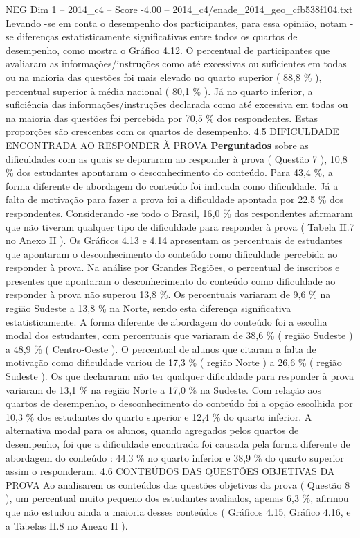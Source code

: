 \begin{textsample}{NEG Dim 1 – 2014\_c4 – Score -4.00 – 2014\_c4/enade\_2014\_geo\_cfb538f104.txt}
Levando -se em conta o desempenho dos participantes, para essa opinião, notam -se diferenças estatisticamente significativas entre todos os quartos de desempenho, como mostra o Gráfico 4.12.
O percentual de participantes que avaliaram as informações/instruções como até excessivas ou suficientes em todas ou na maioria das questões foi mais elevado no quarto superior ( 88,8 \% ), percentual superior à média nacional ( 80,1 \% ).
Já no quarto inferior, a suficiência das informações/instruções declarada como até excessiva em todas ou na maioria das questões foi percebida por 70,5 \% dos respondentes.
Estas proporções são crescentes com os quartos de desempenho. 4.5 DIFICULDADE ENCONTRADA AO RESPONDER À PROVA \textbf{Perguntados} sobre as dificuldades com as quais se depararam ao responder à prova ( Questão 7 ), 10,8 \% dos estudantes apontaram o desconhecimento do conteúdo.
Para 43,4 \%, a forma diferente de abordagem do conteúdo foi indicada como dificuldade.
Já a falta de motivação para fazer a prova foi a dificuldade apontada por 22,5 \% dos respondentes.
Considerando -se todo o Brasil, 16,0 \% dos respondentes afirmaram que não tiveram qualquer tipo de dificuldade para responder à prova ( Tabela II.7 no Anexo II ).
Os Gráficos 4.13 e 4.14 apresentam os percentuais de estudantes que apontaram o desconhecimento do conteúdo como dificuldade percebida ao responder à prova.
Na análise por Grandes Regiões, o percentual de inscritos e presentes que apontaram o desconhecimento do conteúdo como dificuldade ao responder à prova não superou 13,8 \%.
Os percentuais variaram de 9,6 \% na região Sudeste a 13,8 \% na Norte, sendo esta diferença significativa estatisticamente.
A forma diferente de abordagem do conteúdo foi a escolha modal dos estudantes, com percentuais que variaram de 38,6 \% ( região Sudeste ) a 48,9 \% ( Centro-Oeste ).
O percentual de alunos que citaram a falta de motivação como dificuldade variou de 17,3 \% ( região Norte ) a 26,6 \% ( região Sudeste ).
Os que declararam não ter qualquer dificuldade para responder à prova variaram de 13,1 \% na região Norte a 17,0 \% na Sudeste.
Com relação aos quartos de desempenho, o desconhecimento do conteúdo foi a opção escolhida por 10,3 \% dos estudantes do quarto superior e 12,4 \% do quarto inferior.
A alternativa modal para os alunos, quando agregados pelos quartos de desempenho, foi que a dificuldade encontrada foi causada pela forma diferente de abordagem do conteúdo : 44,3 \% no quarto inferior e 38,9 \% do quarto superior assim o responderam. 4.6 CONTEÚDOS DAS QUESTÕES OBJETIVAS DA PROVA Ao analisarem os conteúdos das questões objetivas da prova ( Questão 8 ), um percentual muito pequeno dos estudantes avaliados, apenas 6,3 \%, afirmou que não estudou ainda a maioria desses conteúdos ( Gráficos 4.15, Gráfico 4.16, e a Tabelas II.8 no Anexo II ).

\end{textsample}
